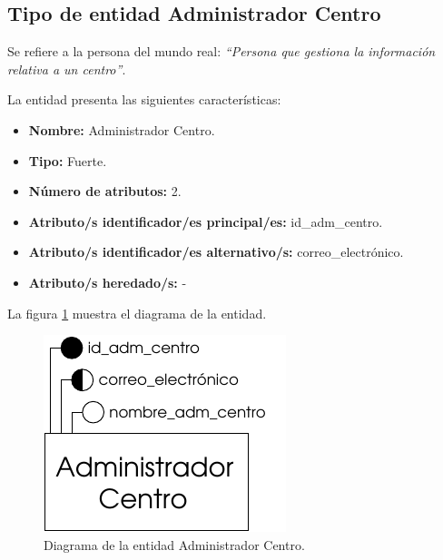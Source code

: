 \subsection{Tipo de entidad Administrador Centro}

   \begin{description}

   \item[Definición] Se refiere a la persona del mundo real: \emph{``Persona
   que gestiona la información relativa a un centro''}.

   \item[Características] La entidad presenta las siguientes características:
      \begin{itemize}
         \item \textbf{Nombre:} Administrador Centro.
         \item \textbf{Tipo:} Fuerte.
         \item \textbf{Número de atributos:} 2.
         \item \textbf{Atributo/s identificador/es principal/es:} id\_adm\_centro.
         \item \textbf{Atributo/s identificador/es alternativo/s:} correo\_electrónico.
         \item \textbf{Atributo/s heredado/s:} -
      \end{itemize}

   \item[Diagrama] La figura \ref{diagramaAdminCentro} muestra el diagrama de la entidad.
   \item \begin{figure}[!ht]
            \begin{center}
            \includegraphics[]{07.Modelo_Entidad-Interrelacion/7.2.Analisis_Entidades/diagramas/adm_centro.pdf}
            \caption{Diagrama de la entidad Administrador Centro.}
            \label{diagramaAdminCentro}
            \end{center}
         \end{figure}


\end{description}
